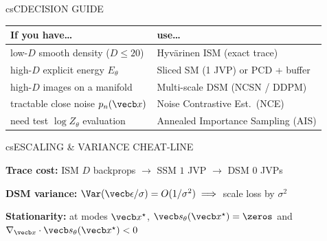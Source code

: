 \documentclass[../../../../master.tex]{subfiles}
\begin{document}
\begin{cscolumns}
\begin{cscard}{csC}{DECISION GUIDE}
  \renewcommand{\arraystretch}{1.22}\small
  \begin{tabular}{@{}>{\raggedright\arraybackslash}p{3.1cm}>{\raggedright\arraybackslash}p{4.6cm}@{}}
    \textbf{If you have\ldots} & \textbf{use\ldots}\\ \hline
    low-$D$ smooth density ($D\le 20$) & Hyv\"arinen ISM (exact trace)\\
    high-$D$ explicit energy $E_\theta$ & Sliced SM (1 JVP) or PCD + buffer\\
    high-$D$ images on a manifold & Multi-scale DSM (NCSN / DDPM)\\
    tractable close noise $p_n(\vecb x)$ & Noise Contrastive Est.\ (NCE)\\
    need test $\log Z_\theta$ evaluation & Annealed Importance Sampling (AIS)\\
  \end{tabular}
\end{cscard}

\begin{cscard}{csE}{SCALING \& VARIANCE CHEAT-LINE}
  \begin{csbul}
    \item \textbf{Trace cost:} ISM $D$ backprops $\to$ SSM $1$ JVP $\to$ DSM $0$ JVPs
    \item \textbf{DSM variance:} $\Var(\vecb\epsilon/\sigma)=O(1/\sigma^2)\implies$ scale loss by $\sigma^2$
    \item \textbf{Stationarity:} at modes $\vecb x^\star$, $\vecb s_\theta(\vecb x^\star)=\zeros$ and $\nabla_{\vecb x}\cdot\vecb s_\theta(\vecb x^\star)<0$
  \end{csbul}
\end{cscard}


\end{cscolumns}
\end{document}

